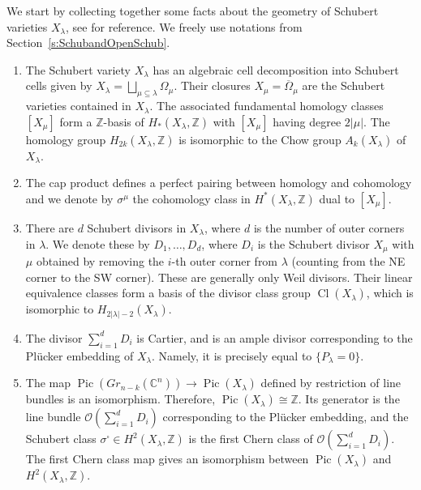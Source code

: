 \documentclass{amsart}
\theoremstyle{definition}
\numberwithin{equation}{section}
\newcommand{\Pic}{\operatorname{Pic}}
\newcommand{\Cl}{\operatorname{Cl}}
\newcommand{\C}{\mathbb{C}}
\newcommand{\Z}{\mathbb{Z}}
\begin{document}
We start by collecting together some facts about the geometry of Schubert varieties $X_\lambda$, see \cite{Manivel,LakBrown15, Humphreys, Springer} for reference. We freely use notations from Section~\ref{s:SchubandOpenSchub}. 
\begin{enumerate}
\item The Schubert variety $X_\lambda$ has an algebraic cell decomposition into Schubert cells given by $X_\lambda=\bigsqcup_{\mu\subseteq\lambda}\Omega_{\mu}$. Their closures $X_\mu=\overline{\Omega}_\mu$ are the Schubert varieties contained in $X_\lambda$. 
The associated fundamental homology classes $[X_{\mu}]$ form a $\Z$-basis of  $H_*(X_{\lambda},\Z)$ with $[X_{\mu}]$ having degree $2|\mu|$. The homology group $H_{2k}(X_{\lambda},\Z)$ is isomorphic to the Chow group $A_k(X_\lambda)$ of $X_\lambda$. 
\item The cap product defines a perfect pairing between homology and cohomology and we denote by $\sigma^{\mu}$ the cohomology class in $H^*(X_{\lambda},\Z)$ dual to $[X_{\mu}]$. 
\item There are $d$ Schubert divisors in $X_\lambda$, where $d$  is the number of outer corners in $\lambda$. We denote these by $D_1,\dotsc, D_d$, where $D_i$ is the Schubert divisor $X_{\mu}$ with $\mu$ obtained by removing the $i$-th outer corner from $\lambda$ (counting from the NE corner to the SW corner). These are generally only Weil divisors. Their linear equivalence classes form a basis of the divisor class group $\Cl(X_\lambda)$, which is isomorphic to $H_{2|\lambda|-2}(X_\lambda)$. 
\item  
The divisor $\sum_{i=1}^d D_i$ is Cartier, and is an ample divisor corresponding to the Pl\"ucker embedding of $X_{\lambda}$. Namely, it is precisely equal to $\{P_{\lambda}=0\}$. 
\item 
The map $\Pic(Gr_{n-k}(\C^n))\to \Pic(X_\lambda)$ defined by restriction of line bundles is an isomorphism. 
Therefore, $\Pic(X_\lambda)\cong \Z$. Its generator is the line bundle $\mathcal O(\sum_{i=1}^d D_i)$ corresponding to the Pl\"ucker embedding, and the Schubert class $\sigma^{\square}\in H^2(X_\lambda,\Z)$ is the first Chern class of $\mathcal O(\sum_{i=1}^d D_i)$. The first Chern class map gives an isomorphism between $\Pic(X_{\lambda})$ and $H^2(X_\lambda,\Z)$.
\end{enumerate} 
\end{document}
